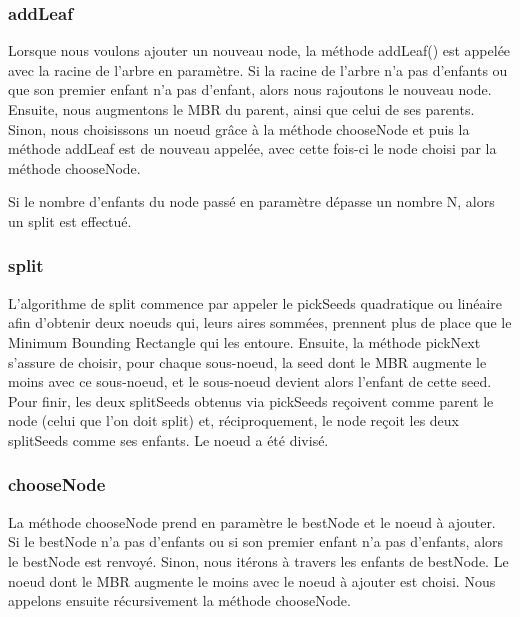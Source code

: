 \documentclass[utf8]{article}
\begin{document}
\begin{large}
  \subsubsection{addLeaf}
  \par
  \indent
  Lorsque nous voulons ajouter un nouveau node, la méthode addLeaf() est appelée
  avec la racine de l'arbre en paramètre. Si la racine de l'arbre n'a pas
  d'enfants ou que son premier enfant n'a pas d'enfant, alors nous rajoutons le
  nouveau node. Ensuite, nous augmentons le MBR du parent, ainsi que celui de
  ses parents. Sinon, nous choisissons un noeud grâce à la méthode chooseNode et
  puis la méthode addLeaf est de nouveau appelée, avec cette fois-ci le node
  choisi par la méthode chooseNode.
  \par
  \indent
  Si le nombre d'enfants du node passé en paramètre dépasse un nombre N, alors
  un split est effectué.
  \par
  \subsubsection{split}
  \par
  \indent
  L'algorithme de split commence par appeler le pickSeeds quadratique ou
  linéaire afin d'obtenir deux noeuds qui, leurs aires sommées, prennent plus de
  place que le Minimum Bounding Rectangle qui les entoure. \newline Ensuite, la
  méthode pickNext s'assure de choisir, pour chaque sous-noeud, la seed dont le
  MBR augmente le moins avec ce sous-noeud, et le sous-noeud devient alors
  l'enfant de cette seed. \newline Pour finir, les deux splitSeeds obtenus via
  pickSeeds reçoivent comme parent le node (celui que l'on doit split) et,
  réciproquement, le node reçoit les deux splitSeeds comme ses enfants. Le noeud
  a été divisé.
  \par

  \subsubsection{chooseNode}
  \par
  \indent
  La méthode chooseNode prend en paramètre le bestNode et le noeud à ajouter.
  Si le bestNode n'a pas d'enfants ou si son premier enfant n'a pas d'enfants,
  alors le bestNode est renvoyé. Sinon, nous itérons à travers les enfants de
  bestNode. Le noeud dont le MBR augmente le moins avec le noeud à ajouter est
  choisi. Nous appelons ensuite récursivement la méthode chooseNode.


\end{large}
\end{document}
